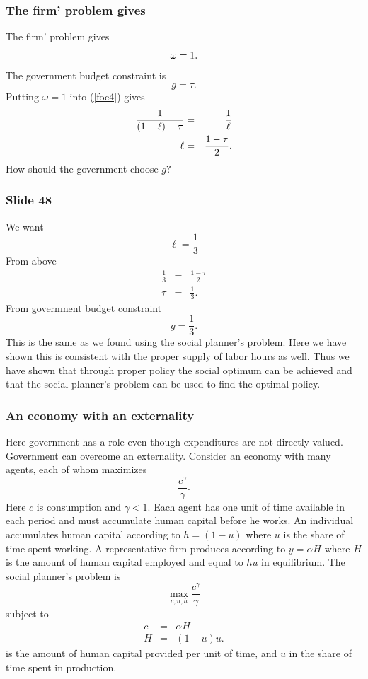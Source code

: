 \documentclass[aspectratio=169]{ltx-talk}
\begin{document}
\begin{frame}
\frametitle{The firm{'} problem gives}
The firm' problem gives 
\begin{equation}
\omega =1.  \notag
\end{equation}%
The government budget constraint is%
\begin{equation}
g=\tau .  \label{bc}
\end{equation}%
Putting $\omega =1$ into (\ref{foc4}) gives 
\begin{eqnarray}
\frac{1}{\left( 1-\ell \right) -\tau } &=&\frac{1}{\ell }  \label{foc5} \\
\ell &=&\frac{1-\tau }{2}.  \notag
\end{eqnarray}%
$\allowbreak $How should the government choose $g?$
\end{frame}

\begin{frame}
\frametitle{Slide 48}
We want 
\begin{equation*}
\ell =\frac{1}{3}
\end{equation*}%
From above%
\begin{eqnarray*}
\frac{1}{3} &=&\frac{1-\tau }{2} \\
\tau &=&\frac{1}{3}.
\end{eqnarray*}%
From government budget constraint%
\begin{equation*}
g=\frac{1}{3}.
\end{equation*}%
This is the same as we found using the social planner's problem. Here we
have shown this is consistent with the proper supply of labor hours as well.
Thus we have shown that through proper policy the social optimum can be
achieved and that the social planner's problem can be used to find the
optimal policy.
\end{frame}

\begin{frame}
\frametitle{An economy with an externality}
Here government has a role even though expenditures are not directly valued.
Government can overcome an externality. Consider an economy with many
agents, each of whom maximizes 
\begin{equation*}
\frac{c^{\gamma }}{\gamma }.
\end{equation*}%
Here $c$ is consumption and $\gamma <1.$ Each agent has one unit of time
available in each period and must accumulate human capital before he works.
An individual accumulates human capital according to $h=\left( 1-u\right) $
where $u$ is the share of time spent working$.$ A representative firm
produces according to $y=\alpha H$ where $H$ is the amount of human capital
employed and equal to $hu$ in equilibrium. The social planner's problem is $%
\ $%
\begin{equation*}
\underset{c,u,h}{\max }\frac{c^{\gamma }}{\gamma }
\end{equation*}%
subject to 
\begin{eqnarray*}
c &=&\alpha H \\
H &=&\left( 1-u\right) u.
\end{eqnarray*}%
is the amount of human capital provided per unit of time, and $u$ in the
share of time spent in production.
\end{frame}
\end{document}
